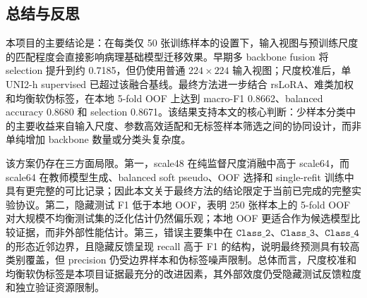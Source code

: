 \documentclass[a4paper,12pt]{article}
\newcommand{\cls}[1]{\texttt{Class\_#1}}
\begin{document}
\begin{table}[H]
    \centering
    \caption{预训练模型来源与许可证记录}
    \label{tab:model-license}
    \small
\end{table}

\subsection{总结与反思}

本项目的主要结论是：在每类仅 50 张训练样本的设置下，输入视图与预训练尺度的匹配程度会直接影响病理基础模型迁移效果。早期多 backbone fusion 将 selection 提升到约 0.7185，但仍使用普通 \(224\times224\) 输入视图；尺度校准后，单 UNI2-h supervised 已超过该融合基线。最终方法进一步结合 rsLoRA、难类加权和均衡软伪标签，在本地 5-fold OOF 上达到 macro-F1 0.8662、balanced accuracy 0.8680 和 selection 0.8671。该结果支持本文的核心判断：少样本分类中的主要收益来自输入尺度、参数高效适配和无标签样本筛选之间的协同设计，而非单纯增加 backbone 数量或分类头复杂度。

该方案仍存在三方面局限。第一，scale48 在纯监督尺度消融中高于 scale64，而 scale64 在教师模型生成、balanced soft pseudo、OOF 选择和 single-refit 训练中具有更完整的可比记录；因此本文关于最终方法的结论限定于当前已完成的完整实验协议。第二，隐藏测试 F1 低于本地 OOF，表明 250 张样本上的 5-fold OOF 对大规模不均衡测试集的泛化估计仍然偏乐观；本地 OOF 更适合作为候选模型比较证据，而非外部性能估计。第三，错误主要集中在 \(\cls{2}\)、\(\cls{3}\)、\(\cls{4}\) 的形态近邻边界，且隐藏反馈呈现 recall 高于 F1 的结构，说明最终预测具有较高类别覆盖，但 precision 仍受边界样本和伪标签噪声限制。总体而言，尺度校准和均衡软伪标签是本项目证据最充分的改进因素，其外部效度仍受隐藏测试反馈粒度和独立验证资源限制。
\end{document}
